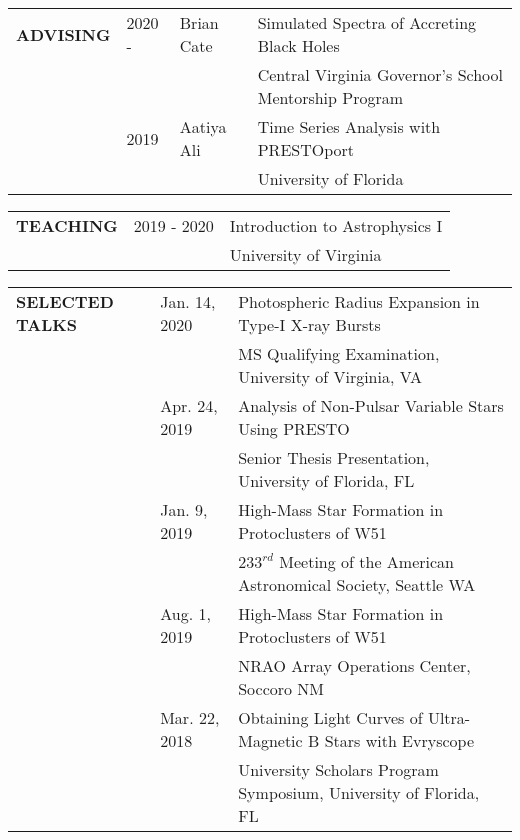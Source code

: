 \documentclass{article}
\begin{document}
\begin{tabular}{p{4cm}p{2.2cm}ll}
    \large{\textbf{ADVISING}} & 2020 - & Brian Cate & Simulated Spectra of Accreting Black Holes\\
     & & & \small Central Virginia Governor's School Mentorship Program \vspace{0.125cm}\\
    & 2019 & Aatiya Ali & Time Series Analysis with PRESTOport \\
     & & & \small University of Florida
\end{tabular}
\vspace{0.5cm}


\begin{tabular}{p{4cm}p{2.2cm}l}
    \large{\textbf{TEACHING}} & 2019 - 2020 & Introduction to Astrophysics I \\
     & & University of Virginia
\end{tabular}
\vspace{0.5cm}



\begin{tabular}{p{4cm}p{2.2cm}l}
    \large{\textbf{SELECTED \newline TALKS}}&Jan. 14, 2020 & Photospheric Radius Expansion in Type-I X-ray Bursts \vspace{-0.45cm}\\
    &              & \small MS Qualifying Examination, University of Virginia, VA  \vspace{0.125cm} \\
    &Apr. 24, 2019 & Analysis of Non-Pulsar Variable Stars Using PRESTO \\
    &              & \small Senior Thesis Presentation, University of Florida, FL \vspace{0.125cm} \\ 
    &Jan. 9, 2019 & High-Mass Star Formation in Protoclusters of W51 \\
    &            & \small $233^{rd}$ Meeting of the American Astronomical Society, Seattle WA  \vspace{0.125cm} \\
    &Aug. 1, 2019 & High-Mass Star Formation in Protoclusters of W51 \\
    &             & \small NRAO Array Operations Center, Soccoro NM  \vspace{0.125cm} \\
    &Mar. 22, 2018 & Obtaining Light Curves of Ultra-Magnetic B Stars with Evryscope\\
    &              & \small University Scholars Program Symposium, University of Florida, FL  \vspace{0.125cm} \\
\end{tabular}
\vspace{0.5cm}
\end{document}
